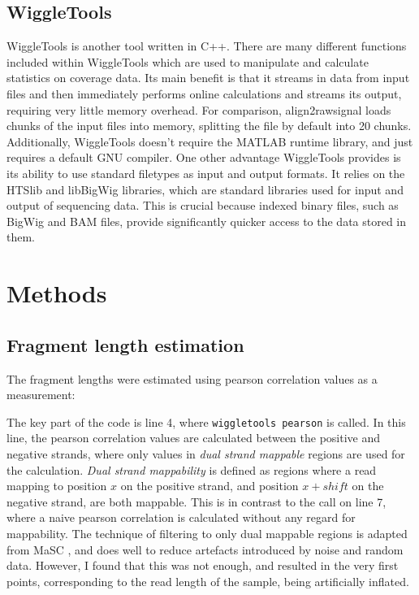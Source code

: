 \documentclass[a4paper]{article}
\begin{document}
    \subsection{WiggleTools}
    WiggleTools is another tool written in C++. There are many different functions included within WiggleTools which are
    used to manipulate and calculate statistics on coverage data. Its main benefit is that it streams in data from input files and then
    immediately performs online calculations and streams its output, requiring very little memory overhead. For comparison,
    align2rawsignal loads chunks of the input files into memory, splitting the file by default into 20 chunks. Additionally,
    WiggleTools doesn't require the MATLAB runtime library, and just requires a default GNU compiler.
    One other advantage WiggleTools provides is its ability to use standard filetypes as input and output formats. It relies on the
    HTSlib and libBigWig libraries, which are standard libraries used for input and output of sequencing data.
    This is crucial because indexed binary files, such as BigWig and BAM files, provide
    significantly quicker access to the data stored in them.

  \section{Methods}

    \subsection{Fragment length estimation}
    The fragment lengths were estimated using pearson correlation values as a measurement:
    
    The key part of the code is line 4, where \verb$wiggletools pearson$ is called. In this line, the pearson correlation
    values are calculated between the positive and negative strands, where only values in \textit{dual strand mappable}
    regions are used for the calculation. \textit{Dual strand mappability} is defined as regions where a read mapping to
    position $x$ on the positive strand, and position $x + shift$ on the negative strand, are both mappable. This is in contrast
    to the call on line 7, where a naive pearson correlation is calculated without any regard for mappability. The technique
    of filtering to only dual mappable regions is adapted from MaSC \cite{ramachandran_masc:_2013}, and does well to reduce artefacts introduced
    by noise and random data. However, I found that this was not enough, and resulted in the very first points, corresponding
    to the read length of the sample, being artificially inflated.
\end{document}
